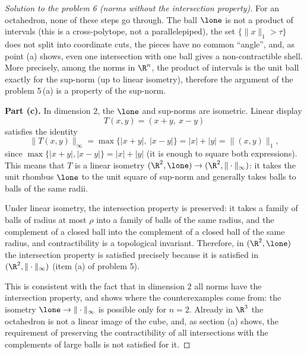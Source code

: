 \documentclass[a4paper,12pt]{report}
\begin{document}
\begin{proof}[Solution to the problem \textup{6} \textup{(}norms without the intersection property\textup{)}]
For an octahedron, none of these steps go through. The ball $\lone$ is not a product of intervals \textup{(}this is a cross-polytope, not a parallelepiped\textup{)}, the set $\bigl\{ \|x\|_1 > \tau \bigr\}$ does not split into coordinate cuts, the pieces have no common ``angle'', and, as point \textup{(a)} shows, even one intersection with one ball gives a non-contractible shell. More precisely, among the norms in $\R^n$, the product of intervals is the unit ball exactly for the sup-norm \textup{(}up to linear isometry\textup{)}, therefore the argument of the problem \textup{5}\,\textup{(a)} is a property of the sup-norm.

\textbf{Part \textup{(c)}.} In dimension $2$, the $\lone$ and sup-norms are isometric. Linear display
\[
T(x, y) = (x + y,\ x - y)
\]
satisfies the identity
\[
\bigl\| T(x, y) \bigr\|_\infty = \max \bigl\{ |x + y|,\ |x - y| \bigr\} = |x| + |y| = \bigl\| (x, y)\bigr\|_1,
\]
since $\max\{ |x+y|, |x-y| \} = |x| + |y|$ \textup{(}it is enough to square both expressions\textup{)}. This means that $T$ is a linear isometry $(\R^2, \lone) \to (\R^2, \|\cdot\|_\infty)$: it takes the unit rhombus $\lone$ to the unit square of sup-norm and generally takes balls to balls of the same radii.

Under linear isometry, the intersection property is preserved: it takes a family of balls of radius at most $\rho$ into a family of balls of the same radius, and the complement of a closed ball into the complement of a closed ball of the same radius, and contractibility is a topological invariant. Therefore, in $(\R^2, \lone)$ the intersection property is satisfied precisely because it is satisfied in $(\R^2, \|\cdot\|_\infty)$ \textup{(}item \textup{(a)} of problem \textup{5}\textup{)}.

This is consistent with the fact that in dimension $2$ all norms have the intersection property, and shows where the counterexamples come from: the isometry $\lone \to \|\cdot\|_\infty$ is possible only for $n = 2$. Already in $\R^3$ the octahedron is not a linear image of the cube, and, as section \textup{(a)} shows, the requirement of preserving the contractibility of all intersections with the complements of large balls is not satisfied for it.

\end{proof}
\end{document}
